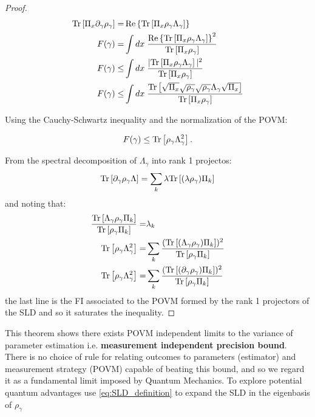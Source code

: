\begin{proof}
\begin{align}
  \mathrm{Tr}\left[\Pi_{x}\partial_{\gamma}\rho_{\gamma}\right] =& \operatorname{Re}\left\{\mathrm{Tr}\left[\Pi_{x}\rho_{\gamma}\Lambda_{\gamma}\right]\right\}\\
   F(\gamma) =& \int dx\hspace{0.1cm} \frac{\operatorname{Re}\left\{\mathrm{Tr}\left[\Pi_{x}\rho_{\gamma}\Lambda_{\gamma}\right]\right\}^{2}}{\mathrm{Tr}\left[\Pi_{x}\rho_{\gamma}\right]}\\
   F(\gamma) \leq& \int dx\hspace{0.1cm} \frac{|\mathrm{Tr}\left[\Pi_{x}\rho_{\gamma}\Lambda_{\gamma}\right]|^{2}}{\mathrm{Tr}\left[\Pi_{x}\rho_{\gamma}\right]}\\
   F(\gamma) \leq& \int dx\hspace{0.1cm} \frac{\mathrm{Tr}\left[\sqrt{\Pi_{x}}\sqrt{\rho_{\gamma}}\sqrt{\rho_{\gamma}}\Lambda_{\gamma}\sqrt{\Pi_{x}}\right]}{\mathrm{Tr}\left[\Pi_{x}\rho_{\gamma}\right]}\\
\end{align}

Using the Cauchy-Schwartz inequality and the normalization of the POVM:

\begin{equation}
F(\gamma) \leq  \mathrm{Tr}\left[\rho_{\gamma}\Lambda_{\gamma}^{2}\right].
\end{equation}

From the spectral decomposition of $\Lambda_{\gamma}$ into rank 1 projectos:
\begin{equation}
\mathrm{Tr}\left[\partial_{\gamma}\rho_{\gamma}\Lambda\right] = \sum_{k} \lambda\mathrm{Tr}\left[(\lambda\rho_{\gamma})\Pi_{k}\right]
\end{equation}
and noting that:
\begin{align}
\frac{\mathrm{Tr}\left[\Lambda_{\gamma}\rho_{\gamma}\Pi_{k}\right]}{\mathrm{Tr}\left[\rho_{\gamma}\Pi_{k}\right]} =& \lambda_{k}\\
\mathrm{Tr}\left[\rho_{\gamma}\Lambda_{\gamma}^{2}\right] =& \sum_{k} \frac{(\mathrm{Tr}\left[(\Lambda_{\gamma}\rho_{\gamma})\Pi_{k}\right])^{2}}{\mathrm{Tr}\left[\rho_{\gamma}\Pi_{k}\right]}\\
\mathrm{Tr}\left[\rho_{\gamma}\Lambda_{\gamma}^{2}\right] =&\sum_{k} \frac{(\mathrm{Tr}\left[(\partial_{\gamma}\rho_{\gamma})\Pi_{k}\right])^{2}}{\mathrm{Tr}\left[\rho_{\gamma}\Pi_{k}\right]}
\end{align}
the last line is the FI associated to the POVM formed by the rank 1 projectors of the SLD and so it saturates the inequality.
\end{proof}

This theorem shows there exists POVM independent limits to the variance of parameter estimation
i.e.  \textbf{measurement independent precision bound}. There is no choice of rule for relating outcomes to parameters (estimator) and
measurement strategy (POVM) capable of beating this bound, and so we regard it as a fundamental limit imposed by Quantum Mechanics.
To explore potential quantum advantages use \eqref{eq:SLD_definition} to expand the SLD in the eigenbasis of $\rho_{\gamma}$

